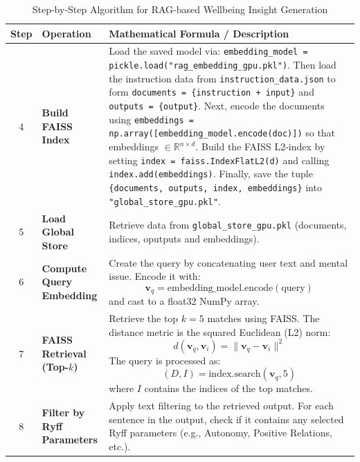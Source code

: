 \begin{table}[H]
    \centering
    \caption*{Step-by-Step Algorithm for RAG-based Wellbeing Insight Generation}
    \label{tab:algorithm}
    \begin{tabularx}{\textwidth}{|c|p{3cm}|X|}
        \hline
        \textbf{Step} & \textbf{Operation} & \textbf{Mathematical Formula / Description} \\ \hline
        
        4 & \textbf{Build FAISS Index} & Load the saved model via: \texttt{embedding\_model = pickle.load("rag\_embedding\_gpu.pkl")}. Then load the instruction data from \texttt{instruction\_data.json} to form \texttt{documents = \{instruction + input\}} and \texttt{outputs = \{output\}}. Next, encode the documents using \texttt{embeddings = np.array([embedding\_model.encode(doc)])} so that embeddings $\in \mathbb{R}^{n \times d}$. Build the FAISS L2-index by setting \texttt{index = faiss.IndexFlatL2(d)} and calling \texttt{index.add(embeddings)}. Finally, save the tuple \texttt{\{documents, outputs, index, embeddings\}} into \texttt{"global\_store\_gpu.pkl"}. \\ \hline


        5 & \textbf{Load Global Store} & Retrieve data from \texttt{global\_store\_gpu.pkl} (documents, indices, oputputs and embeddings).
        \\ \hline
        
        6 & \textbf{Compute Query Embedding} & Create the query by concatenating user text and mental issue. Encode it with:
        \[
        \mathbf{v}_q = \text{embedding\_model.encode}(\text{query})
        \]
        and cast to a float32 NumPy array. \\ \hline
        
        7 & \textbf{FAISS Retrieval (Top-\(k\))} & Retrieve the top \(k=5\) matches using FAISS. The distance metric is the squared Euclidean (L2) norm:
        \[
        d(\mathbf{v}_q, \mathbf{v}_i) = \|\mathbf{v}_q - \mathbf{v}_i\|^2
        \]
        The query is processed as:
        \[
        (D, I) = \text{index.search}(\mathbf{v}_q, 5)
        \]
        where \(I\) contains the indices of the top matches. \\ \hline
        
        8 & \textbf{Filter by Ryff Parameters} & Apply text filtering to the retrieved output. For each sentence in the output, check if it contains any selected Ryff parameters (e.g., Autonomy, Positive Relations, etc.). \\ \hline
        

\end{tabularx}
\end{table}
